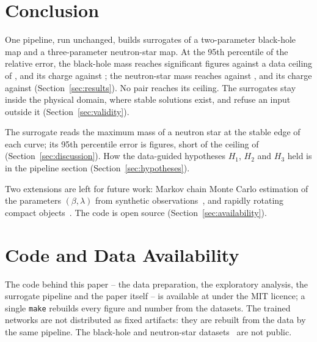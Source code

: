 \section{Conclusion}
\label{sec:conclusion}

One pipeline, run unchanged, builds surrogates of a two-parameter black-hole map and a three-parameter neutron-star map. At the 95th percentile of the relative error, the black-hole mass reaches \resultsBhMassTest{} significant figures against a data ceiling of \resultsBhMassCeiling{}, and its charge \resultsBhChargeTest{} against \resultsBhChargeCeiling{}; the neutron-star mass reaches \resultsNsMassTest{} against \resultsNsMassCeiling{}, and its charge \resultsNsChargeTest{} against \resultsNsChargeCeiling{} (Section~\ref{sec:results}). No pair reaches its ceiling. The surrogates stay inside the physical domain, where stable solutions exist, and refuse an input outside it (Section~\ref{sec:validity}).

The surrogate reads the maximum mass of a neutron star at the stable edge of each curve; its 95th percentile error is \discussionMassPNinetyFiveDigits{} figures, short of the ceiling of \discussionMassCeiling{} (Section~\ref{sec:discussion}). How the data-guided hypotheses $H_1$, $H_2$ and $H_3$ held is in the pipeline section (Section~\ref{sec:hypotheses}).

Two extensions are left for future work: Markov chain Monte Carlo estimation of the parameters $(\beta, \lambda)$ from synthetic observations~\citep{Reed2024}, and rapidly rotating compact objects~\citep{Komatsu1989,Cook1994,Stergioulas1995}. The code is open source (Section~\ref{sec:availability}).

\section*{Code and Data Availability}
\label{sec:availability}

The code behind this paper -- the data preparation, the exploratory analysis, the surrogate pipeline and the paper itself -- is available at \paperrepo{} under the MIT licence; a single \texttt{make} rebuilds every figure and number from the datasets. The trained networks are not distributed as fixed artifacts: they are rebuilt from the data by the same pipeline. The black-hole and neutron-star datasets~\citep{Doneva2017_BH,Doneva2017_NS} are not public.
